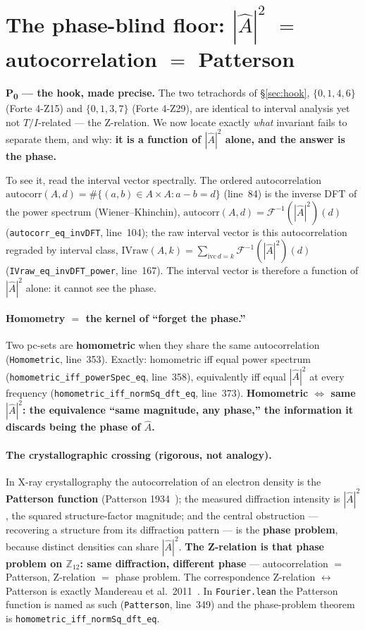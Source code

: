 \documentclass[11pt]{article}
\newcommand{\lean}[1]{\texttt{#1}}
\newcommand{\Ztwelve}{\mathbb{Z}_{12}}
\newcommand{\Ahat}{\hat{A}}
\newcommand{\Fi}{\mathcal{F}^{-1}}
\begin{document}
\section{The phase-blind floor: \texorpdfstring{$|\Ahat|^2$}{|A|^2} \texorpdfstring{$=$}{=} autocorrelation \texorpdfstring{$=$}{=} Patterson}\label{sec:floor}

\noindent\textbf{P\textsubscript{0} --- the hook, made precise.} The two tetrachords of
\S\ref{sec:hook}, $\{0,1,4,6\}$ (Forte 4-Z15) and $\{0,1,3,7\}$ (Forte 4-Z29), are identical to interval
analysis yet not $T/I$-related --- the Z-relation. We now locate exactly \emph{what} invariant fails to
separate them, and why: \textbf{it is a function of $|\Ahat|^2$ alone, and the answer is the phase.}

To see it, read the interval vector spectrally. The ordered autocorrelation
$\mathrm{autocorr}(A,d)=\#\{(a,b)\in A\times A: a-b=d\}$ (line~84)
is the inverse DFT of the power spectrum (Wiener--Khinchin),
$\mathrm{autocorr}(A,d)=\Fi(|\Ahat|^2)(d)$ (\lean{autocorr\_eq\_invDFT}, line~104); the raw interval vector
is this autocorrelation regraded by interval class, $\mathrm{IVraw}(A,k)=\sum_{\mathrm{ivc}\,d=k}
\Fi(|\Ahat|^2)(d)$ (\lean{IVraw\_eq\_invDFT\_power}, line~167). The interval vector is therefore a function
of $|\Ahat|^2$ alone: it cannot see the phase.

\paragraph{Homometry $=$ the kernel of ``forget the phase.''} Two pc-sets are \textbf{homometric} when
they share the same autocorrelation (\lean{Homometric}, line~353). Exactly: homometric iff equal power
spectrum (\lean{homometric\_iff\_powerSpec\_eq}, line~358), equivalently iff equal $|\Ahat|^2$ at every
frequency (\lean{homometric\_iff\_normSq\_dft\_eq}, line~373). \textbf{Homometric $\iff$ same $|\Ahat|^2$:
the equivalence ``same magnitude, any phase,'' the information it discards being the phase of $\Ahat$.}

\paragraph{The crystallographic crossing (rigorous, not analogy).} In X-ray crystallography the
autocorrelation of an electron density is the \textbf{Patterson function} (Patterson 1934~\cite{Patterson});
the measured diffraction intensity is $|\Ahat|^2$, the squared structure-factor magnitude; and the central
obstruction --- recovering a structure from its diffraction pattern --- is the \textbf{phase problem},
because distinct densities can share $|\Ahat|^2$. \textbf{The Z-relation is that phase problem on
$\Ztwelve$: same diffraction, different phase} --- autocorrelation $=$ Patterson, Z-relation $=$ phase
problem. The correspondence Z-relation $\leftrightarrow$ Patterson is exactly
Mandereau et al.\ 2011~\cite{MAAA}. In \lean{Fourier.lean} the Patterson function is named
as such (\lean{Patterson}, line~349) and the phase-problem theorem is \lean{homometric\_iff\_normSq\_dft\_eq}.
\end{document}
